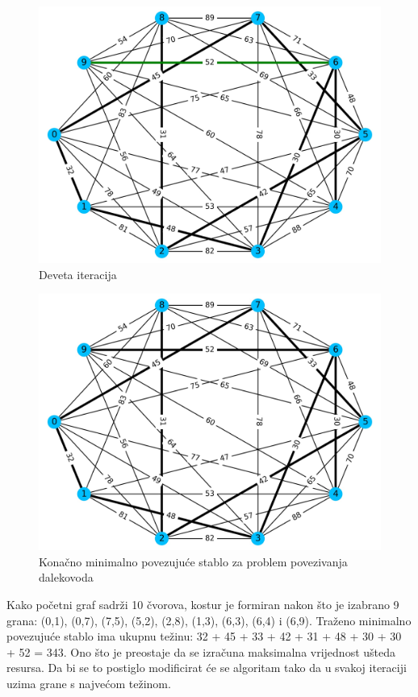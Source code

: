 \documentclass[conference]{IEEEtran}
\begin{document}
\begin{figure}[H]
\centering
\includegraphics[width=1\linewidth]{slike/300dpi/9d.jpg}
\caption{Deveta iteracija}
\label{figmat}
\end{figure}

\begin{figure}[H]
\centering
\includegraphics[width=1\linewidth]{slike/300dpi/10d.jpg}
\caption{Konačno minimalno povezujuće stablo za problem povezivanja dalekovoda}
\label{figmat}
\end{figure}

Kako početni graf sadrži 10 čvorova, kostur je formiran nakon što je izabrano 9 grana: (0,1), (0,7), (7,5), (5,2), (2,8), (1,3), (6,3), (6,4) i (6,9). Traženo minimalno povezujuće stablo ima ukupnu težinu: 32 + 45 + 33 + 42 + 31 + 48 + 30 + 30 + 52 = 343. Ono što je preostaje da se izračuna maksimalna vrijednost ušteda resursa. Da bi se to postiglo modificirat će se algoritam tako da u svakoj iteraciji uzima grane s najvećom težinom.
\end{document}
